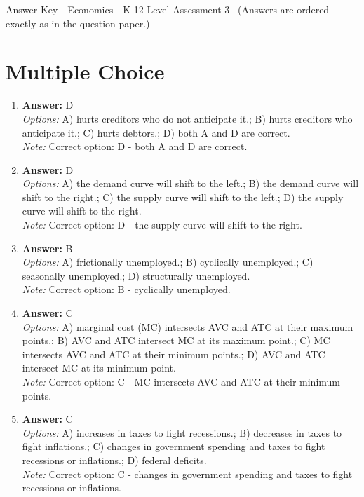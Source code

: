 \documentclass[12pt]{article}
\begin{document}
\begin{center}
Answer Key - Economics - K-12 Level Assessment 3 \
\small (Answers are ordered exactly as in the question paper.)
\end{center}

\section*{Multiple Choice}
\begin{enumerate}[label=\arabic*.]
\item \textbf{Answer:} D
\\ \textit{Options:} A) hurts creditors who do not anticipate it.; B) hurts creditors who anticipate it.; C) hurts debtors.; D) both A and D are correct.
\\ \textit{Note:} Correct option: D - both A and D are correct.
\item \textbf{Answer:} D
\\ \textit{Options:} A) the demand curve will shift to the left.; B) the demand curve will shift to the right.; C) the supply curve will shift to the left.; D) the supply curve will shift to the right.
\\ \textit{Note:} Correct option: D - the supply curve will shift to the right.
\item \textbf{Answer:} B
\\ \textit{Options:} A) frictionally unemployed.; B) cyclically unemployed.; C) seasonally unemployed.; D) structurally unemployed.
\\ \textit{Note:} Correct option: B - cyclically unemployed.
\item \textbf{Answer:} C
\\ \textit{Options:} A) marginal cost (MC) intersects AVC and ATC at their maximum points.; B) AVC and ATC intersect MC at its maximum point.; C) MC intersects AVC and ATC at their minimum points.; D) AVC and ATC intersect MC at its minimum point.
\\ \textit{Note:} Correct option: C - MC intersects AVC and ATC at their minimum points.
\item \textbf{Answer:} C
\\ \textit{Options:} A) increases in taxes to fight recessions.; B) decreases in taxes to fight inflations.; C) changes in government spending and taxes to fight recessions or inflations.; D) federal deficits.
\\ \textit{Note:} Correct option: C - changes in government spending and taxes to fight recessions or inflations.
\end{enumerate}
\end{document}
